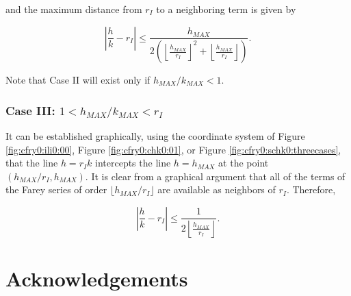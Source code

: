 and the maximum distance from $r_I$ to a neighboring term is
given by

\begin{equation}
\label{eq:cfry0:schk0:caseiimaxplacementerror}
\left|
\frac{h}{k} - r_I
\right|
\leq
\frac{h_{MAX}}{2 \left( { {\left\lfloor {\frac{h_{MAX}}{r_I}} \right\rfloor}^2
+ \left\lfloor {\frac{h_{MAX}}{r_I}} \right\rfloor } \right) }.
\end{equation}

Note that Case II will exist only if $h_{MAX}/k_{MAX} < 1$.


\subsubsection[Case III:  $1 < h_{MAX}/k_{MAX} < r_I$]
              {Case III:  \mbox{\boldmath $1 < h_{MAX}/k_{MAX} < r_I$}}

It can be established graphically, using the coordinate system of
Figure \ref{fig:cfry0:ili0:00}, Figure \ref{fig:cfry0:chk0:01},
or Figure \ref{fig:cfry0:schk0:threecases}, 
that the line $h=r_I k$ intercepts the
line $h=h_{MAX}$ at the point $(h_{MAX}/r_I, h_{MAX})$.  It is clear
from a graphical argument that all of the terms of the Farey series
of order $\lfloor h_{MAX}/r_I \rfloor$ are available as neighbors
of $r_I$.  Therefore,

\begin{equation}
\label{eq:cfry0:schk0:caseiiiplacementerror}
\left|
\frac{h}{k} - r_I
\right|
\leq
\frac{1}{2 \left\lfloor \frac{h_{MAX}}{r_I} \right\rfloor}.
\end{equation}


\section{Acknowledgements}

